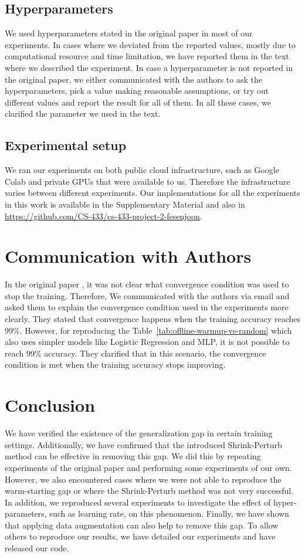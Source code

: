 \subsection{Hyperparameters}
We used hyperparameters stated in the original paper in most of our experiments. In cases where we deviated from the reported values, mostly due to computational resource and time limitation, we have reported them in the text where we described the experiment.  In case a hyperparameter is not reported in the original paper, we either communicated with the authors to ask the hyperparameters, pick a value making reasonable assumptions, or try out different values and report the result for all of them. In all these cases, we clarified the parameter we used in the text.

\subsection{Experimental setup}
We ran our experiments on both public cloud infrastructure, such as Google Colab and private GPUs that were available to us. Therefore the infrastructure varies between different experiments. 
%
%
%
Our implementations for all the experiments in this work is available in the Supplementary Material and also in 
\url{https://github.com/CS-433/cs-433-project-2-fesenjoon}. 
%


\section{Communication with Authors}
In the original paper \cite{original-paper}, it was not clear what convergence condition was used to stop the training. Therefore, We communicated with the authors via email and asked them to explain the convergence condition used in the experiments more clearly. They stated that convergence happens when the training accuracy reaches 99\%. However, for reproducing the Table~\ref{tab:offline-warmup-vs-random} which also uses simpler models like Logistic Regression and MLP, it is not possible to reach 99\% accuracy. They clarified that in this scenario, the convergence condition is met when the training accuracy stops improving. 

\section{Conclusion}
%

We have verified the existence of the generalization gap in certain training settings. Additionally, we have confirmed that the introduced Shrink-Perturb method can be effective in removing this gap. We did this by repeating experiments of the original paper and performing some experiments of our own. However, we also encountered cases where we were not able to reproduce the warm-starting gap or where the Shrink-Perturb method was not very successful. In addition, we reproduced several experiments to investigate the effect of hyper-parameters, such as learning rate, on this phenomenon. Finally, we have shown that applying data augmentation can also help to remove this gap. To allow others to reproduce our results, we have detailed our experiments and have released our code.